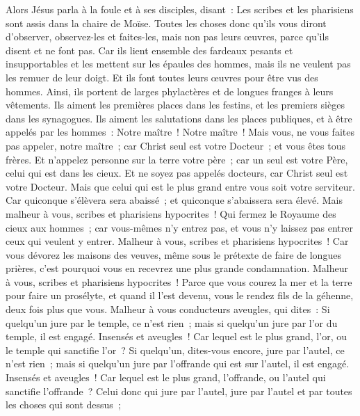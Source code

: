 \begin{multicols}{2}
\VerseOne{}Alors Jésus parla à la foule et à ses disciples,
disant~: Les scribes et les pharisiens sont assis dans la chaire de Moïse.
Toutes les choses donc qu'ils vous diront d'observer, observez-les et faites-les, mais non pas leurs œuvres, parce qu'ils disent et ne font pas.
Car ils lient ensemble des fardeaux pesants et insupportables et les mettent sur les épaules des hommes, mais ils ne veulent pas les remuer de leur doigt.
Et ils font toutes leurs œuvres pour être vus des hommes. Ainsi, ils portent de larges phylactères et de longues franges à leurs vêtements.
Ils aiment les premières places dans les festins, et les premiers sièges dans les synagogues.
Ils aiment les salutations dans les places publiques, et à être appelés par les hommes~: Notre maître~! Notre maître~!
Mais vous, ne vous faites pas appeler, notre maître~; car Christ seul est votre Docteur~; et vous êtes tous frères.
Et n'appelez personne sur la terre votre père~; car un seul est votre Père, celui qui est dans les cieux.
Et ne soyez pas appelés docteurs, car Christ seul est votre Docteur.
Mais que celui qui est le plus grand entre vous soit votre serviteur.
Car quiconque s'élèvera sera abaissé~; et quiconque s'abaissera sera élevé.
Mais malheur à vous, scribes et pharisiens hypocrites~! Qui fermez le Royaume des cieux aux hommes~; car vous-mêmes n'y entrez pas, et vous n'y laissez pas entrer ceux qui veulent y entrer.
Malheur à vous, scribes et pharisiens hypocrites~! Car vous dévorez les maisons des veuves, même sous le prétexte de faire de longues prières, c'est pourquoi vous en recevrez une plus grande condamnation.
Malheur à vous, scribes et pharisiens hypocrites~! Parce que vous courez la mer et la terre pour faire un prosélyte, et quand il l'est devenu, vous le rendez fils de la géhenne, deux fois plus que vous.
Malheur à vous conducteurs aveugles, qui dites~: Si quelqu'un jure par le temple, ce n'est rien~; mais si quelqu'un jure par l'or du temple, il est engagé.
Insensés et aveugles~! Car lequel est le plus grand, l'or, ou le temple qui sanctifie l'or~?
Si quelqu'un, dites-vous encore, jure par l'autel, ce n'est rien~; mais si quelqu'un jure par l'offrande qui est sur l'autel, il est engagé.
Insensés et aveugles~! Car lequel est le plus grand, l'offrande, ou l'autel qui sanctifie l'offrande~?
Celui donc qui jure par l'autel, jure par l'autel et par toutes les choses qui sont dessus~;

\end{multicols}
